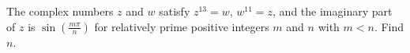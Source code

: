 The complex numbers $z$ and $w$ satisfy $z^{13} = w$, $w^{11} = z$, and the imaginary part of $z$ is $\sin\left(\frac{m\pi}n\right)$ for relatively prime positive integers $m$ and $n$ with $m < n$. Find $n$.